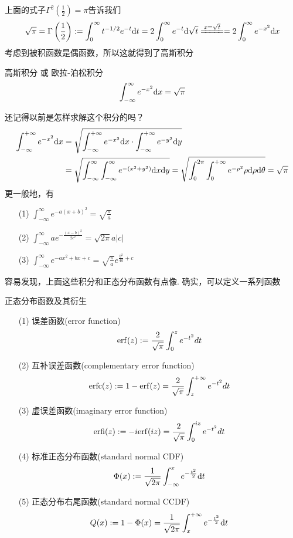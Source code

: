 \documentclass[main.tex]{subfiles}
\begin{document}
上面的式子\(\displaystyle{\Gamma^2\left(\frac{1}{2}\right) = \pi}\)告诉我们
\[\sqrt{\pi} = \Gamma\left(\frac{1}{2}\right) := \int_{0}^{\infty}t^{-1/2}e^{-t}\trm{d}t = 2\int_{0}^{\infty}e^{-t}\trm{d}\sqrt{t} \xlongequal[]{x=\sqrt{t}} = 2\int_{0}^{\infty}e^{-x^2}\trm{d}x\]
考虑到被积函数是偶函数，所以这就得到了高斯积分
\begin{theorem}{高斯积分 或 欧拉-泊松积分}
    \[\int_{-\infty}^{\infty}e^{-x^2}{\rm d}x = \sqrt{\pi}\]
\end{theorem}
还记得以前是怎样求解这个积分的吗？
\begin{align*}
    \int_{-\infty}^{+\infty} e^{-x^2} {\rm d} x &= \sqrt{\int_{-\infty}^{+\infty} e^{-x^2} {\rm d}x \cdot \int_{-\infty}^{+\infty} e^{-y^2} {\rm d}y} \\
    &= \sqrt{\int_{-\infty}^{\infty}\int_{-\infty}^{\infty} e^{-(x^2+y^2)} {\rm d}x {\rm d} y} = \sqrt{\int_{0}^{2 \pi}\int_{0}^{+\infty} e^{-\rho^2} \rho{\rm d} \rho {\rm d} \theta} = \sqrt{\pi}
\end{align*}
更一般地，有
\begin{itemize}
    \item [(1)] \(\displaystyle{\int_{-\infty}^{\infty}e^{-a(x+b)^2} = \sqrt{\frac{\pi}{a}}}\)
    \item [(2)] \(\displaystyle{\int_{-\infty}^{\infty}ae^{-\frac{(x-b)^2}{2c^2}} = \sqrt{2\pi}a|c|}\)
    \item [(3)] \(\displaystyle{\int_{-\infty}^{\infty}e^{-ax^2+bx+c} = \sqrt{\frac{\pi}{a}}}e^{\frac{b^2}{4a}+c}\)
\end{itemize}

容易发现，上面这些积分和正态分布函数有点像. 确实，可以定义一系列函数
\begin{definition}{正态分布函数及其衍生}
    \begin{itemize}
        \item [(1)] 误差函数(error function)
        \[ {\rm erf}(z):=\frac{2}{\sqrt{\pi}}\int_{0}^{z}e^{-t^{2}}dt \]
        \item [(2)] 互补误差函数(complementary error function)
        \[ {\rm erfc}(z) := 1-{\rm erf}(z) = \frac{2}{\sqrt{\pi}}\int_{z}^{+\infty}e^{-t^{2}}dt \]
        \item [(3)] 虚误差函数(imaginary error function)
        \[ {\rm erfi}(z) := -i{\rm erf}(iz) = \frac{2}{\sqrt{\pi}}\int_{0}^{iz}e^{-t^{2}}dt \]
        \item [(4)] 标准正态分布函数(standard normal CDF)
        \[ \Phi(x) := \frac{1}{\sqrt{2\pi}} \int_{-\infty}^{x} e^{-\frac{t^2}{2}} {\rm d}t \]
        \item [(5)] 正态分布右尾函数(standard normal CCDF)
        \[ Q(x) := 1-\Phi(x) = \frac{1}{\sqrt{2\pi}} \int_{x}^{+\infty} e^{-\frac{t^2}{2}} {\rm d}t \]
    \end{itemize}
\end{definition}
\end{document}
